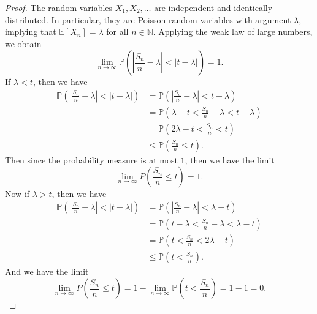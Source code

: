 \documentclass[12pt]{article}
\newcommand{\N}{\mathbb{N}}
\renewcommand{\P}{\mathbb{P}}
\newcommand{\E}{\mathbb{E}}
\begin{document}
\begin{proof}
    The random variables $X_1, X_2, \dots$ are independent and identically distributed. In particular, they are Poisson random variables with argument $\lambda$, implying that $\E[X_n] = \lambda$ for all $n \in \N$. Applying the weak law of large numbers, we obtain
    \[
        \lim_{n \to \infty} \P\left( \left| \frac{S_n}{n} - \lambda \right| < |t - \lambda| \right) = 1.
    \]
    If $\lambda < t$, then we have
    \begin{align*}
        \P\left( \left| \frac{S_n}{n} - \lambda \right| < |t - \lambda| \right)
        &= \P\left( \left| \frac{S_n}{n} - \lambda \right| < t - \lambda \right) \\
            &= \P\left( \lambda - t < \frac{S_n}{n} - \lambda < t - \lambda \right) \\
            &= \P\left( 2\lambda - t < \frac{S_n}{n} < t \right) \\
            &\leq \P\left( \frac{S_n}{n} \leq t \right).
    \end{align*}
    Then since the probability measure is at most $1$, then we have the limit
    \[
        \lim_{n \to \infty} P\left( \frac{S_n}{n}\leq t \right) = 1.
    \]
    Now if $\lambda > t$, then we have
    \begin{align*}
        \P\left( \left| \frac{S_n}{n} - \lambda \right| < |t - \lambda| \right)
        &= \P\left( \left| \frac{S_n}{n} - \lambda \right| < \lambda - t \right) \\
            &= \P\left( t - \lambda < \frac{S_n}{n} - \lambda < \lambda - t \right) \\
            &= \P\left( t < \frac{S_n}{n} < 2\lambda - t \right) \\
            &\leq \P\left( t < \frac{S_n}{n}\right).
    \end{align*}
    And we have the limit
    \[
        \lim_{n \to \infty} P\left( \frac{S_n}{n}\leq t \right) = 1 - \lim_{n \to \infty} \P\left( t < \frac{S_n}{n}\right) = 1 - 1 = 0.
    \]
    
\end{proof}


\section{}

\subsection{}
\end{document}
